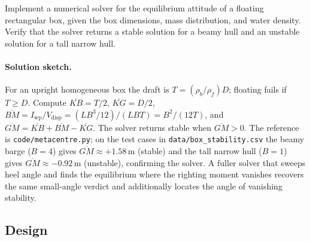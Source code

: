 \begin{exercise}
Implement a numerical solver for the equilibrium attitude of a
floating rectangular box, given the box dimensions, mass
distribution, and water density. Verify that the solver returns
a stable solution for a beamy hull and an unstable solution for
a tall narrow hull.

\paragraph{Solution sketch.} For an upright homogeneous box the draft is
$T = (\rho_b/\rho_f)D$; floating fails if $T \ge D$. Compute
$\overline{KB} = T/2$, $\overline{KG} = D/2$, $\overline{BM} =
I_{\text{wp}}/V_{\text{disp}} = (LB^3/12)/(LBT) = B^2/(12T)$, and
$\overline{GM} = \overline{KB} + \overline{BM} - \overline{KG}$. The
solver returns stable when $\overline{GM} > 0$. The reference is
\texttt{code/metacentre.py}; on the test cases in
\texttt{data/box\_stability.csv} the beamy barge ($B = 4$) gives
$\overline{GM} \approx +1.58\,\si{\meter}$ (stable) and the tall narrow
hull ($B = 1$) gives $\overline{GM} \approx -0.92\,\si{\meter}$
(unstable), confirming the solver. A fuller solver that sweeps heel
angle and finds the equilibrium where the righting moment vanishes
recovers the same small-angle verdict and additionally locates the angle
of vanishing stability.
\end{exercise}

\subsection*{Design}

